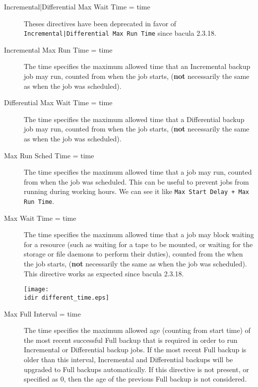 \begin{description}
\item [Incremental|Differential Max Wait Time = \lt{}time\gt{}]
    Theses directives have been deprecated in favor of
    \texttt{Incremental|Differential Max Run Time} since bacula 2.3.18.

\item [Incremental Max Run Time = \lt{}time\gt{}]
The time specifies the maximum allowed time that an Incremental backup job may
run, counted from when the job starts, ({\bf not} necessarily the same as when
the job was scheduled).

\item [Differential Max Wait Time = \lt{}time\gt{}]
The time specifies the maximum allowed time that a Differential backup job may
run, counted from when the job starts, ({\bf not} necessarily the same as when
the job was scheduled).

\item [Max Run Sched Time = \lt{}time\gt{}]

The time specifies the maximum allowed time that a job may run, counted from
when the job was scheduled. This can be useful to prevent jobs from running
during working hours. We can see it like \texttt{Max Start Delay + Max Run
  Time}.

\item [Max Wait Time = \lt{}time\gt{}]
   The time specifies the maximum allowed time that a job may block waiting
   for a resource (such as waiting for a tape to be mounted, or waiting for
   the storage or file daemons to perform their duties), counted from the
   when the job starts, ({\bf not} necessarily the same as when the job was
   scheduled). This directive works as expected since bacula 2.3.18.

\texttt{[image: \\idir different\_time.eps]}

\item [Max Full Interval = \lt{}time\gt{}]
   The time specifies the maximum allowed age (counting from start time) of
   the most recent successful Full backup that is required in order to run
   Incremental or Differential backup jobs. If the most recent Full backup
   is older than this interval, Incremental and Differential backups will be
   upgraded to Full backups automatically. If this directive is not present,
   or specified as 0, then the age of the previous Full backup is not
   considered.


\end{description}
